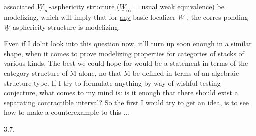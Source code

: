 
associated $\underline{W}_{\infty}$-asphericity structure ($\underline{W}_{\infty}$ = usual weak equivalence)  be
modelizing, which will imply that for \uline{any} basic localizer $\underline{W}$ , the corres%
ponding $\underline{W}$-asphericity structure is modelizing.

Even if I do'nt look into this question now, it'll turn up soon
enough in a similar shape, when it comes to prove modelizing properties
for categories of stacks of various kinds. The best we could hope for
would be a statement in terms of the category structure of M alone,  
no   that M be defined in terms of an algebraic
structure type. If I try to formulate anything by way of wishful
testing conjecture, what comes to my mind is: is it enough that there
should exist a separating contractible interval? So the first I would try
to get an idea, is to see how to make a counterexample to this ...

3.7.

